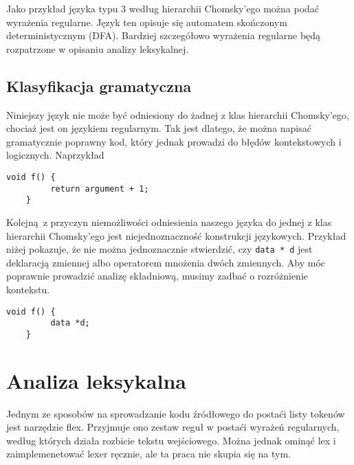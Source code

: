 \documentclass[leqno, 12pt]{article}
\newcommand{\spacing}{\vskip 0.5cm}
\begin{document}
			\spacing

			Jako przykład języka typu 3 według hierarchii Chomsky'ego można podać wyrażenia regularne. Język ten
			opisuje się automatem skończonym deterministycznym (DFA). Bardziej szczegółowo wyrażenia regularne będą
			rozpatrzone w opisaniu analizy leksykalnej.
			
		\subsection{Klasyfikacja gramatyczna}

			Niniejszy język nie może być odniesiony do żadnej z klas hierarchii Chomsky'ego, chociaż jest on
			językiem regularnym. Tak jest dlatego, że można napisać gramatycznie poprawny kod, który jednak prowadzi
			do błędów kontekstowych i logicznych. Naprzykład 
			
			\spacing
			
			\begin{lstlisting}[caption={}, label={lst:ambigous-production}]
	void f() {
		 return argument + 1;
	}
			\end{lstlisting}

			\spacing
			
			Kolejną z przyczyn niemożliwości odniesienia naszego języka do jednej z klas hierarchii Chomsky'ego
			jest niejednoznaczność konstrukcji językowych. Przykład niżej pokazuje, że nie można jednoznacznie
			stwierdzić, czy \texttt{data * d} jest deklaracją zmiennej albo operatorem mnożenia dwóch zmiennych.
			Aby móc poprawnie prowadzić analizę składniową, musimy zadbać o rozróżnienie kontekstu.

			\spacing
			
			\begin{lstlisting}[caption={}, label={lst:ambigous-production}]
	void f() {
		 data *d;
	}
			\end{lstlisting}

			\newpage

	\section{Analiza leksykalna}

		Jednym ze sposobów na sprowadzanie kodu źródłowego do postaći listy tokenów jest narzędzie flex.
		Przyjmuje ono zestaw reguł w postaći wyrażeń regularnych, według których
		działa rozbicie tekstu wejściowego. Można jednak ominąć lex i zaimplemenetować lexer ręcznie, ale
		ta praca nie skupia się na tym.
\end{document}
